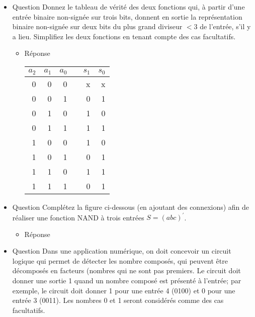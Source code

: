 \documentclass[letter, oneside]{book}
\begin{document}
\begin{itemize}
\item Question
\label{sec:org5d80e41}
Donnez le tableau de vérité des deux fonctions qui, à partir d'une
entrée binaire non-signée sur trois bits, donnent en sortie la
représentation binaire non-signée sur deux bits du plus grand diviseur
\(< 3\) de l'entrée, s'il y a lieu. Simplifiez les deux fonctions en
tenant compte des cas facultatifs.

\begin{itemize}
\item Réponse
\label{sec:org7951feb}
\begin{center}
\begin{tabular}{rrrlrr}
\(a_2\) & \(a_1\) & \(a_0\) &  & \(s_1\) & \(s_0\)\\[0pt]
\hline
0 & 0 & 0 &  & x & x\\[0pt]
0 & 0 & 1 &  & 0 & 1\\[0pt]
0 & 1 & 0 &  & 1 & 0\\[0pt]
0 & 1 & 1 &  & 1 & 1\\[0pt]
1 & 0 & 0 &  & 1 & 0\\[0pt]
1 & 0 & 1 &  & 0 & 1\\[0pt]
1 & 1 & 0 &  & 1 & 1\\[0pt]
1 & 1 & 1 &  & 0 & 1\\[0pt]
\end{tabular}
\end{center}
\end{itemize}

\item Question
\label{sec:orga943480}
Complétez la figure ci-dessous (en ajoutant des connexions) afin de
réaliser une fonction NAND à trois entrées \(S = (a b c)^{\prime}\).

\begin{center}

\end{center}

\begin{itemize}
\item Réponse
\label{sec:org2f1085e}
\begin{center}

\end{center}
\end{itemize}

\item Question
\label{sec:org59b5303}
Dans une application numérique, on doit concevoir un circuit logique
qui permet de détecter les nombre composés, qui peuvent être
décomposés en facteurs (nombres qui ne sont pas premiers. Le circuit
doit donner une sortie 1 quand un nombre composé est présenté à
l'entrée; par exemple, le circuit doit donner 1 pour une entrée 4
(0100) et 0 pour une entrée 3 (0011). Les nombres 0 et 1 seront
considérés comme des cas facultatifs.


\end{itemize}
\end{document}
